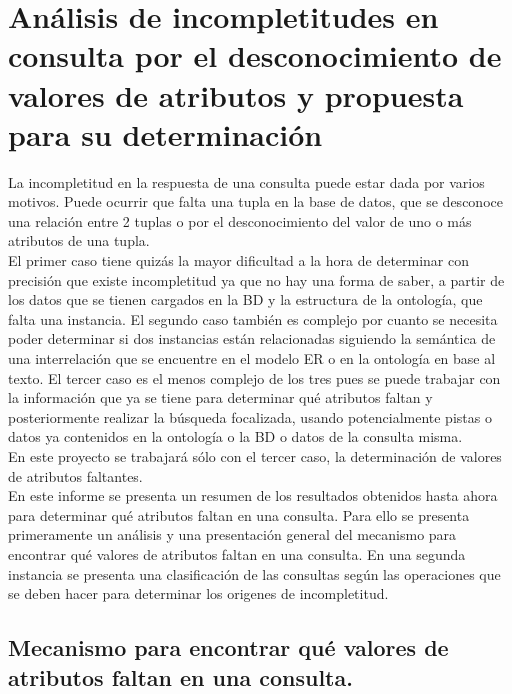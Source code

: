 \chapter{Análisis de incompletitudes en consulta por el desconocimiento de valores de atributos y propuesta para su determinación} \label{chap:analisisOrigenIncompletitud}

\newcommand{\RESULT}[3]{
	\text{#1} \\[5pt]
}
\newcommand{\QUERY}[1]{
	\begin{center}
	\emph{#1}
	\end{center}
}


La incompletitud en la respuesta de una consulta puede estar dada por varios motivos. Puede ocurrir que falta una tupla en la base de datos, que se desconoce una relación entre 2 tuplas o por el desconocimiento del valor de uno o más atributos de una tupla. \\

El primer caso tiene quizás la mayor dificultad a la hora de determinar con precisión que existe incompletitud ya que no hay una forma de saber, a partir de los datos que se tienen cargados en la BD y la estructura de la ontología, que falta una instancia. El segundo caso también es complejo por cuanto se necesita poder determinar si dos instancias están relacionadas siguiendo la semántica de una interrelación que se encuentre en el modelo ER o en la ontología en base al texto. El tercer caso es el menos complejo de los tres pues se puede trabajar con la información que ya se tiene para determinar qué atributos faltan y posteriormente realizar la búsqueda focalizada, usando potencialmente pistas o datos ya contenidos en la ontología o la BD o datos de la consulta misma.\\

En este proyecto se trabajará sólo con el tercer caso, la determinación de valores de atributos faltantes.\\

En este informe se presenta un resumen de los resultados obtenidos hasta ahora  para determinar qué atributos faltan en una consulta. Para ello se presenta primeramente un análisis y una presentación general del mecanismo para encontrar qué valores de atributos faltan en una consulta. En una segunda instancia se presenta una clasificación de las consultas según las operaciones que se deben hacer para determinar los origenes de incompletitud.\\

\section{Mecanismo para encontrar qué valores de atributos faltan en una consulta.}\label{section-mecanismoEncontrarValoresFaltantes}

